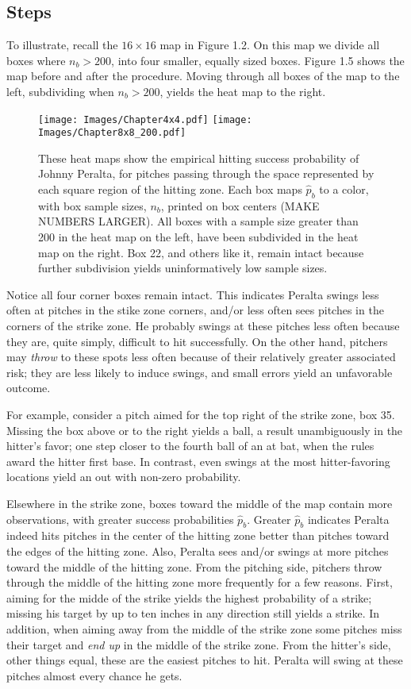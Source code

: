 \subsection{Steps}

To illustrate, recall the $16 \times 16$ map in Figure 1.2. On this map we divide all boxes where $n_{b} > 200$, into four smaller, equally sized boxes. Figure 1.5 shows the map before and after the procedure. Moving through all boxes of the map to the left, subdividing when $n_{b} > 200$, yields the heat map to the right.
        \begin{figure}[H]
      	\centering
      	\texttt{[image: Images/Chapter4x4.pdf]} 
      	\texttt{[image: Images/Chapter8x8\_200.pdf]} 
      	\caption{These heat maps show the empirical hitting success probability of Johnny Peralta, for pitches passing through the space represented by each square region of the hitting zone.  Each box maps $\hat{p}_{b}$ to a color, with box sample sizes, $n_{b}$, printed on box centers (MAKE NUMBERS LARGER). All boxes with a sample size greater than 200 in the heat map on the left, have been subdivided in the heat map on the right. Box 22, and others like it, remain intact because further subdivision yields uninformatively low sample sizes.}
      	\end{figure} 
      	
Notice all four corner boxes remain intact. This indicates Peralta  swings less often at pitches in the stike zone corners, and/or less often sees pitches in the corners of the strike zone. He probably swings at these pitches less often because they are, quite simply, difficult to hit successfully. On the other hand, pitchers may {\it throw} to these spots less often because of their relatively greater associated risk; they are less likely to induce swings, and small errors yield an unfavorable outcome. 

For example, consider a pitch aimed for the top right of the strike zone, box 35. Missing the box above or to the right yields a ball, a result unambiguously in the hitter's favor; one step closer to the fourth ball of an at bat, when the rules award the hitter first base. In contrast, even swings at the most hitter-favoring locations yield an out with non-zero probability.

Elsewhere in the strike zone, boxes toward the middle of the map contain more observations, with greater success probabilities $\hat{p}_{b}$. Greater $\hat{p}_{b}$ indicates Peralta indeed hits pitches in the center of the hitting zone better than pitches toward the edges of the hitting zone. Also, Peralta sees and/or swings at more pitches toward the middle of the hitting zone. From the pitching side, pitchers throw through the middle of the hitting zone more frequently for a few reasons. First, aiming for the midde of the strike yields the highest probability of a strike; missing his target by up to ten inches in any direction still yields a strike. In addition, when aiming away from the middle of the strike zone some pitches miss their target and {\it end up} in the middle of the strike zone. From the hitter's side, other things equal, these are the easiest pitches to hit. Peralta will swing at these pitches almost every chance he gets.


